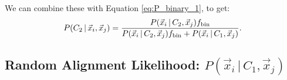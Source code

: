 \documentclass[usenatbib]{mnras}
\newcommand{\given}{\,|\,}
\begin{document}
We can combine these with Equation \ref{eq:P_binary_1}, to get:
\begin{equation}
P(C_2 \given \vec{x}_i, \vec{x}_j) = \frac{P(\vec{x}_i \given C_2, \vec{x}_j) f_{\rm bin} }{P(\vec{x}_i \given C_2, \vec{x}_j) f_{\rm bin}  + P(\vec{x}_i \given C_1, \vec{x}_j) }. \label{eq:P_binary_2}
\end{equation}




\subsection{Random Alignment Likelihood: $P(\vec{x}_i \given C_1, \vec{x}_j)$}
\end{document}
